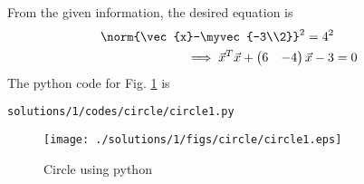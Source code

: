 From the given information, the desired equation is
\begin{align}
\norm{\vec{x}-\myvec{-3\\2}}^2 = 4^2
\\
\implies \vec{x}^T\vec{x}+\myvec{6&-4}\vec{x} -3 &=0
\end{align}
The python code for Fig. \ref{fig:4.1.1_circle} is
\begin{lstlisting}
solutions/1/codes/circle/circle1.py
\end{lstlisting}
\begin{figure}[!ht]
\centering
\texttt{[image: ./solutions/1/figs/circle/circle1.eps]}
\caption{Circle using python}
\label{fig:4.1.1_circle}
\end{figure}

